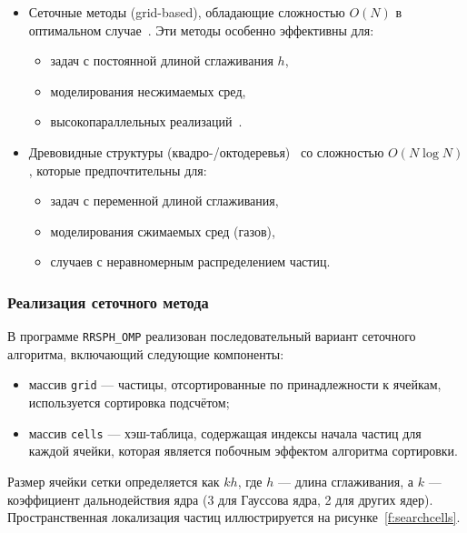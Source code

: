 \begin{itemize}
    \item Сеточные методы (grid-based), обладающие сложностью $O(N)$ 
        в оптимальном случае~\cite{Xia2016, Morillo2015, Nie2014, Monaghan1985}. 
        Эти методы особенно эффективны для:
    \begin{itemize}
        \item задач с постоянной длиной сглаживания $h$,
        \item моделирования несжимаемых сред,
        \item высокопараллельных реализаций~\cite{Gross2019}.
    \end{itemize}
    
    \item Древовидные структуры (квадро-/октодеревья)~\cite{Xia2016} со сложностью $O(N\log N)$, которые предпочтительны для:
    \begin{itemize}
        \item задач с переменной длиной сглаживания,
        \item моделирования сжимаемых сред (газов),
        \item случаев с неравномерным распределением частиц.
    \end{itemize}
\end{itemize}

\subsubsection{Реализация сеточного метода}

В программе \verb|RRSPH_OMP| реализован последовательный вариант сеточного алгоритма, включающий следующие компоненты:

\begin{itemize}
    \item массив \verb|grid| --- частицы, отсортированные по принадлежности к ячейкам, используется сортировка подсчётом;
    \item массив \verb|cells| --- хэш-таблица, содержащая индексы начала частиц для каждой ячейки,
        которая является побочным эффектом алгоритма сортировки.
\end{itemize}

Размер ячейки сетки определяется как $kh$, где $h$ --- длина сглаживания, 
а $k$ --- коэффициент дальнодействия ядра (3 для Гауссова ядра, 2 для других ядер). 
%
Пространственная локализация частиц иллюстрируется на рисунке~\ref{f:searchcells}.


